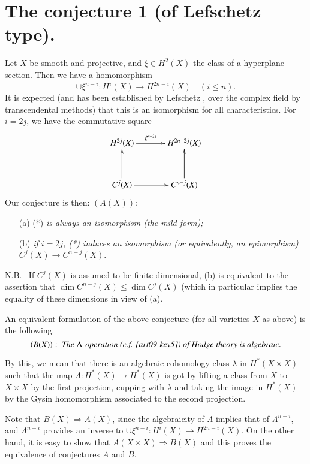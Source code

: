 \section{The conjecture 1 (of Lefschetz type).}\label{art09-sec3}

Let $X$ be smooth and projective, and $\xi\in H^{2}(X)$ the class of a hyperplane section. Then we have a homomorphism
\begin{equation*}
\cup \xi^{n-i}:H^{i}(X)\to H^{2n-i}(X)\quad (i\leq n).\tag{*}
\end{equation*}\pageoriginale
It is expected (and has been established by Lefschetz \cite{art09-key2}, \cite{art09-key5} over the complex field by transcendental methods) that this is an isomorphism for all characteristics. For $i=2j$, we have the commutative square
\[
\xymatrix@=1.2cm{
H^{2j}(X)\ar[r]^-{\xi^{n-2j}} & H^{2n-2j}(X)\\
C^{j}(X)\ar[u]\ar[r] & C^{n-j}(X)\ar[u]
}
\]
Our conjecture is then: $(A(X))$:
\begin{itemize}
\item[(a)] (*) {\em is always an isomorphism (the mild form);}

\item[(b)] {\em if $i=2j$, (*) induces an isomorphism (or equivalently, an epimorphism)} $C^{j}(X)\to C^{n-j}(X)$.
\end{itemize}

N.B.~ If $C^{j}(X)$ is assumed to be finite dimensional, (b) is equivalent to the assertion that $\dim C^{n-j}(X)\leq \dim C^{j}(X)$ (which in particular implies the equality of these dimensions in view of (a).

An equivalent formulation of the above conjecture (for all varieties $X$ as above) is the following.
$$
(B(X)): \text{~\em The $\Lambda$-operation (c.f. \cite{art09-key5}) of Hodge theory is algebraic.}
$$

By this, we mean that there is an algebraic cohomology class $\lambda$ in $H^{*}(X\times X)$ such that the map $\Lambda:H^{*}(X)\to H^{*}(X)$ is got by lifting a class from $X$ to $X\times X$ by the first projection, cupping with $\lambda$ and taking the image in $H^{*}(X)$ by the Gysin homomorphism associated to the second projection.

Note that $B(X)\Rightarrow A(X)$, since the algebraicity of $\Lambda$ implies that of $\Lambda^{n-i}$, and $\Lambda^{n-i}$ provides an inverse to $\cup \xi^{n-i}:H^{i}(X)\to H^{2n-i}(X)$. On the other hand, it is easy to show that $A(X\times X)\Rightarrow B(X)$ and this proves the equivalence of conjectures $A$ and $B$.

